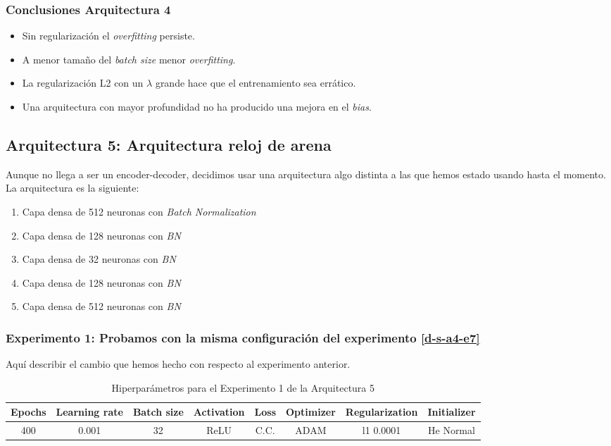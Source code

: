 \documentclass{article}
\begin{document}
        \subsubsection{Conclusiones Arquitectura 4}
        \label{d-cl-a4}
            \begin{itemize}
                \item Sin regularizaci\'on el \textit{overfitting} persiste.
                \item A menor tama\~no del \textit{batch size} menor \textit{overfitting}.
                \item La regularizaci\'on L2 con un $\lambda$ grande hace que el entrenamiento sea err\'atico.
                \item Una arquitectura con mayor profundidad no ha producido una mejora en el \textit{bias}.
            \end{itemize}
            

    \subsection{Arquitectura 5: Arquitectura reloj de arena}
	\label{d-s-a5}
		Aunque no llega a ser un encoder-decoder, decidimos usar una arquitectura algo distinta a las que hemos estado usando hasta el momento. La arquitectura es la siguiente:
		\begin{enumerate}
			\item Capa densa de 512 neuronas con \textit{Batch Normalization}
			\item Capa densa de 128 neuronas con \textit{BN}
			\item Capa densa de 32 neuronas con \textit{BN}
			\item Capa densa de 128 neuronas con \textit{BN}
			\item Capa densa de 512 neuronas con \textit{BN}
		\end{enumerate}
		
		\subsubsection{Experimento 1: Probamos con la misma configuraci\'on del experimento \ref{d-s-a4-e7}}
		\label{d-s-a5-e1}
			Aqu\'i describir el cambio que hemos hecho con respecto al experimento anterior.
		
			\begin{table}[!h]
				\begin{center}
					\begin{tabular}{| c | c | c | c | c | c | c | c |}
						\textbf{Epochs} & \textbf{Learning rate} & \textbf{Batch size} & \textbf{Activation} & \textbf{Loss} & \textbf{Optimizer} & \textbf{Regularization} & \textbf{Initializer}\\ \hline
						 400 & 0.001 & 32 & ReLU & C.C. & ADAM & l1 0.0001 & He Normal
					\end{tabular}
					\caption{Hiperpar\'ametros para el Experimento 1 de la Arquitectura 5}
					\label{tab:hip-d-a5-e1}
				\end{center}
			\end{table}
			
\end{document}
